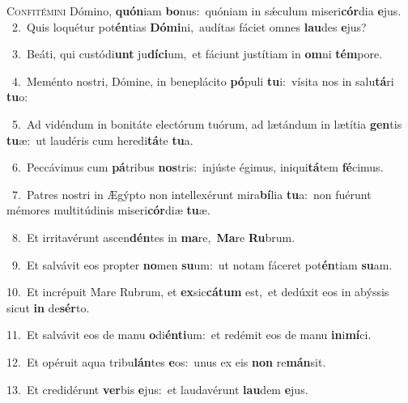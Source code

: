 \lettrine{\initial\textcolor{\initialcolor}{C}}{onfitémini} Dómino, \textbf{quón}\-iam \textbf{bo}\-nus:~\star quóniam in sǽculum miseri\-\textbf{cór}\-dia \textbf{e}\-jus.\\
{\numbfont\textcolor{\numbcolor}{~2.}}~Quis loquétur pot\-\textbf{én}\-tias \textbf{Dó}\-\textbf{mi}ni,~\star audítas fáciet omnes \textbf{lau}\-des \textbf{e}\-jus?\par
{\numbfont\textcolor{\numbcolor}{~3.}}~Beáti, qui custódi\textbf{unt} ju\-\textbf{dí}\-\textbf{ci}um,~\star et fáciunt justítiam in \textbf{om}\-ni \textbf{tém}\-pore.\par
{\numbfont\textcolor{\numbcolor}{~4.}}~Meménto nostri, Dómine, in beneplácito \textbf{pó}\-puli \textbf{tu}\-i:~\star vísita nos in salu\-\textbf{tá}\-ri \textbf{tu}\-o:\par
{\numbfont\textcolor{\numbcolor}{~5.}}~Ad vidéndum in bonitáte electórum tuórum, ad lætándum in lætítia \textbf{gen}\-tis \textbf{tu}\-æ:~\star ut laudéris cum heredi\-\textbf{tá}\-te \textbf{tu}\-a.\par
{\numbfont\textcolor{\numbcolor}{~6.}}~Peccávimus cum \textbf{pá}\-tribus \textbf{nos}\-tris:~\star injúste égimus, iniqui\-\textbf{tá}\-tem \textbf{fé}\-cimus.\par
{\numbfont\textcolor{\numbcolor}{~7.}}~Patres nostri in Ægýpto non intellexérunt mira\-\textbf{bí}\-lia \textbf{tu}\-a:~\star non fuérunt mémores multitúdinis miseri\-\textbf{cór}\-diæ \textbf{tu}\-æ.\par
{\numbfont\textcolor{\numbcolor}{~8.}}~Et irritavérunt ascen\-\textbf{dén}\-tes in \textbf{ma}\-re,~\star \textbf{Ma}\-re \textbf{Ru}\-brum.\par
{\numbfont\textcolor{\numbcolor}{~9.}}~Et salvávit eos propter \textbf{no}\-men \textbf{su}\-um:~\star ut notam fáceret pot\-\textbf{én}\-tiam \textbf{su}\-am.\par
{\numbfont\textcolor{\numbcolor}{10.}}~Et incrépuit Mare Rubrum, et \textbf{ex}\-sic\-\textbf{cá}\-\textbf{tum} est,~\star et dedúxit eos in abýssis sicut \textbf{in} de\-\textbf{sér}\-to.\par
{\numbfont\textcolor{\numbcolor}{11.}}~Et salvávit eos de manu \textbf{o}\-di\-\textbf{én}\-\textbf{ti}um:~\star et redémit eos de manu \textbf{in}\-i\-\textbf{mí}\-ci.\par
{\numbfont\textcolor{\numbcolor}{12.}}~Et opéruit aqua tribu\-\textbf{lán}\-tes \textbf{e}\-os:~\star unus ex eis \textbf{non} re\-\textbf{mán}\-sit.\par
{\numbfont\textcolor{\numbcolor}{13.}}~Et credidérunt \textbf{ver}\-bis \textbf{e}\-jus:~\star et laudavérunt \textbf{lau}\-dem \textbf{e}\-jus.\par
